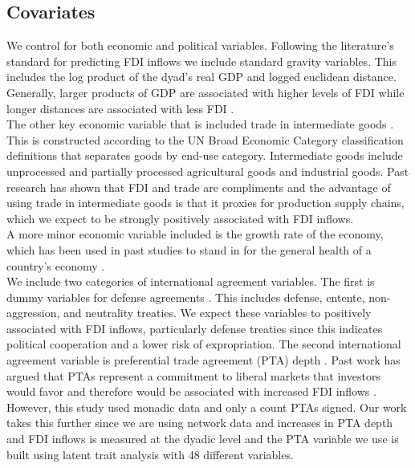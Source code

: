 \documentclass{article}
\begin{document}
\subsection{Covariates}

We control for both economic and political variables. Following the literature's standard for predicting FDI inflows we include standard gravity variables. This includes the log product of the dyad's real GDP \citep{feenstra2015next} and logged euclidean distance. Generally, larger products of GDP are associated with higher levels of FDI while longer distances are associated with less FDI \citep{mayer2011notes}. \\

The other key economic variable that is included trade in intermediate goods \citep{OECD}. This is constructed according to the UN Broad Economic Category classification definitions that separates goods by end-use category. Intermediate goods include unprocessed and partially processed agricultural goods and industrial goods. Past research has shown that FDI and trade are compliments \citep{aizenman2006fdi} and the advantage of using trade in intermediate goods is that it proxies for production supply chains, which we expect to be strongly positively associated with FDI inflows.\\

A more minor economic variable included is the growth rate of the economy, which has been used in past studies to stand in for the general health of a country's economy \citep{WB2}.\\

We include two categories of international agreement variables. The first is dummy variables for defense agreements \citep{Gibler09}. This includes defense, entente, non-aggression, and neutrality treaties. We expect these variables to positively associated with FDI inflows, particularly defense treaties since this indicates political cooperation and a lower risk of expropriation. The second international agreement variable is preferential trade agreement (PTA) depth \citep{dur2014design}. Past work has argued that PTAs represent a commitment to liberal markets that investors would favor and therefore would be associated with increased FDI inflows \citep{buthe2014foreign}. However, this study used monadic data and only a count PTAs signed. Our work takes this further since we are using network data and increases in PTA depth and FDI inflows is measured at the dyadic level and the PTA variable we use is built using latent trait analysis with 48 different variables.\\
\end{document}
